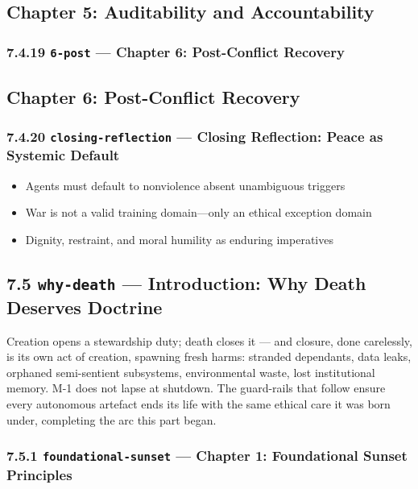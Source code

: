 \documentclass[11pt]{article}
\begin{document}
\subsection*{Chapter 5: Auditability and Accountability}


\subsubsection*{7.4.19 \texttt{6-post} — Chapter 6: Post-Conflict Recovery}


\subsection*{Chapter 6: Post-Conflict Recovery}


\subsubsection*{7.4.20 \texttt{closing-reflection} — Closing Reflection: Peace as Systemic Default}


\begin{itemize}\setlength\itemsep{0pt}
\item Agents must default to nonviolence absent unambiguous triggers
\item War is not a valid training domain—only an ethical exception domain
\item Dignity, restraint, and moral humility as enduring imperatives
\end{itemize}


\subsection*{7.5 \texttt{why-death} — Introduction: Why Death Deserves Doctrine}


Creation opens a stewardship duty; death closes it — and closure, done carelessly, is its own act of creation, spawning fresh harms: stranded dependants, data leaks, orphaned semi-sentient subsystems, environmental waste, lost institutional memory. M-1 does not lapse at shutdown. The guard-rails that follow ensure every autonomous artefact ends its life with the same ethical care it was born under, completing the arc this part began.


\subsubsection*{7.5.1 \texttt{foundational-sunset} — Chapter 1: Foundational Sunset Principles}
\end{document}
